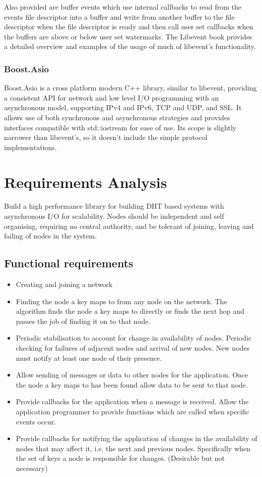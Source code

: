 \documentclass{article}
\begin{document}
Also provided are buffer events which use internal callbacks to read from the events file descriptor into a buffer and write from another buffer to the file descriptor when the file descriptor is ready and then call user set callbacks when the buffers are above or below user set watermarks.
The Libevent book\cite{libevent_book} provides a detailed overview and examples of the usage of much of libevent's functionality.


\subsubsection{Boost.Asio}
Boost.Asio\cite{basio} is a cross platform modern C++ library, similar to libevent, providing a consistent API for network and low level I/O programming with an asynchronous model, supporting IPv4 and IPv6, TCP and UDP, and SSL. It allows use of both synchronous and asynchronous strategies and provides interfaces compatible with std::iostream for ease of use.
Its scope is slightly narrower than libevent's, so it doesn't include the simple protocol implementations.



\section{Requirements Analysis}
Build a high performance library for building DHT based systems with asynchronous I/O for scalability. Nodes should be independent and self organising, requiring no central authority, and be tolerant of joining, leaving and failing of nodes in the system.

\subsection{Functional requirements}
\begin{itemize}
\item
Creating and joining a network
\item
Finding the node a key maps to from any node on the network.
The algorithm finds the node a key maps to directly or finds the next hop and passes the job of finding it on to that node.
\item
Periodic stabilisation to account for change in availability of nodes.
Periodic checking for failures of adjacent nodes and arrival of new nodes. New nodes must notify at least one node of their presence.
\item
Allow sending of messages or data to other nodes for the application.
Once the node a key maps to has been found allow data to be sent to that node.
\item
Provide callbacks for the application when a message is received.
Allow the application programmer to provide functions which are called when specific events occur.
\item
Provide callbacks for notifying the application of changes in the availability of nodes that may affect it, i.e. the next and previous nodes. Specifically when the set of keys a node is responsible for changes. (Desirable but not necessary)
\end{itemize}
\end{document}
